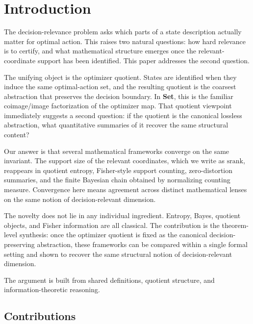 \section{Introduction}\label{sec:introduction}

The decision-relevance problem asks which parts of a state description actually matter for optimal action. This raises two natural questions: how hard relevance is to certify, and what mathematical structure emerges once the relevant-coordinate support has been identified. This paper addresses the second question.

The unifying object is the optimizer quotient. States are identified when they induce the same optimal-action set, and the resulting quotient is the coarsest abstraction that preserves the decision boundary. In \textbf{Set}, this is the familiar coimage/image factorization of the optimizer map. That quotient viewpoint immediately suggests a second question: if the quotient is the canonical lossless abstraction, what quantitative summaries of it recover the same structural content?

Our answer is that several mathematical frameworks converge on the same invariant. The support size of the relevant coordinates, which we write as $\mathrm{srank}$, reappears in quotient entropy, Fisher-style support counting, zero-distortion summaries, and the finite Bayesian chain obtained by normalizing counting measure. Convergence here means agreement across distinct mathematical lenses on the same notion of decision-relevant dimension.

The novelty does not lie in any individual ingredient. Entropy, Bayes, quotient objects, and Fisher information are all classical. The contribution is the theorem-level synthesis: once the optimizer quotient is fixed as the canonical decision-preserving abstraction, these frameworks can be compared within a single formal setting and shown to recover the same structural notion of decision-relevant dimension.

The argument is built from shared definitions, quotient structure, and information-theoretic reasoning.

\subsection{Contributions}

